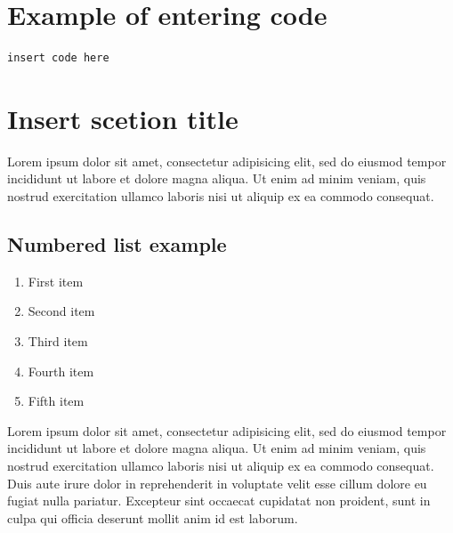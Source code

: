 \documentclass[a4paper]{jpconf} %
\begin{document}
\section{Example of entering code}
\begin{verbatim}
insert code here
\end{verbatim}

\section{Insert scetion title}
Lorem ipsum dolor sit amet, consectetur adipisicing elit, sed do eiusmod tempor incididunt ut labore et dolore magna aliqua. Ut enim ad minim\cite{ref1} veniam, quis nostrud exercitation ullamco laboris nisi ut aliquip ex ea commodo consequat.

\subsection{Numbered list example}
\begin{enumerate}
    \item First item
    \item Second item
    \item Third item
    \item Fourth item
    \item Fifth item
\end{enumerate}

Lorem ipsum dolor sit amet, consectetur adipisicing elit, sed do eiusmod tempor incididunt ut labore et dolore magna aliqua. Ut enim ad minim veniam, quis nostrud exercitation ullamco laboris nisi ut aliquip ex ea commodo\cite{ref2} consequat. Duis aute irure dolor in reprehenderit in voluptate velit esse cillum dolore eu fugiat nulla pariatur. Excepteur sint occaecat cupidatat non proident, sunt in culpa qui officia deserunt mollit anim id est laborum.
\end{document}
